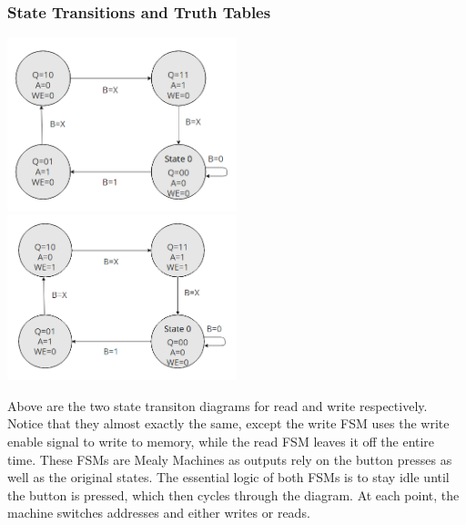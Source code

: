 \documentclass{article}
\begin{document}
        \subsubsection{State Transitions and Truth Tables}
        
        \begin{center}
            \includegraphics[width=0.5\textwidth]{READ_State_Transition.png}
            \includegraphics[width=0.5\textwidth]{WRITE_State_Transition.png}
        \end{center}

        Above are the two state transiton diagrams for read and write respectively. Notice that they almost exactly the same, except the write FSM uses the write enable signal to write to memory, while the read FSM leaves it off the entire time.
        These FSMs are Mealy Machines as outputs rely on the button presses as well as the original states. The essential logic of both FSMs is to stay idle until the button is pressed, which then cycles through the diagram. At each point, the machine switches addresses and either writes or reads.\\ 
\end{document}
